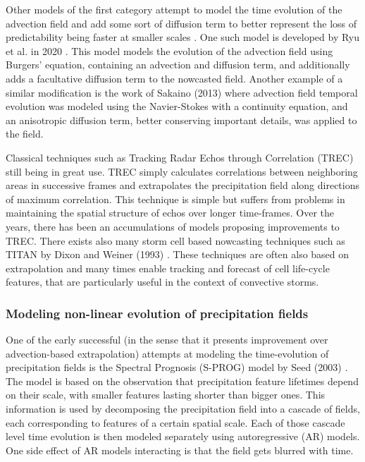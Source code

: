 Other models of the first category attempt to model the time evolution of the advection field and add some sort of diffusion term to better represent the loss of predictability being faster at smaller scales \cite{germann2002scale}. One such model is developed by Ryu et al. in 2020 \cite{ryu_improved_2020}. This model models the evolution of the advection field using Burgers' equation, containing an advection and diffusion term, and additionally adds a facultative diffusion term to the nowcasted field. Another example of a similar modification is the work of Sakaino (2013) \cite{sakaino_spatio-temporal_2013} where advection field temporal evolution was modeled using the Navier-Stokes with a continuity equation, and an anisotropic diffusion term, better conserving important details, was applied to the field. 

Classical techniques such as Tracking Radar Echos through Correlation (TREC) \cite{rinehart_three-dimensional_1978} still being in great use. TREC simply calculates correlations between neighboring areas in successive frames and extrapolates the precipitation field along directions of maximum correlation. This technique is simple but suffers from problems in maintaining the spatial structure of echos over longer time-frames. Over the years, there has been an accumulations of models proposing improvements to TREC. There exists also many storm cell based nowcasting techniques such as TITAN by Dixon and Weiner (1993) \cite{dixon1993titan}. These techniques are often also based on extrapolation and many times enable tracking and forecast of cell life-cycle features, that are particularly useful in the context of convective storms. 

\subsubsection*{Modeling non-linear evolution of precipitation fields}

One of the early successful (in the sense that it presents improvement over advection-based extrapolation) attempts at modeling the time-evolution of precipitation fields is the Spectral Prognosis (S-PROG) model by Seed (2003) \cite{seed_dynamic_2003}. The model is based on the observation that precipitation feature lifetimes depend on their scale, with smaller features lasting shorter than bigger ones. This information is used by decomposing the precipitation field into a cascade of fields, each corresponding to features of a certain spatial scale. Each of those cascade level time evolution is then modeled separately using autoregressive (AR) models. One side effect of AR models interacting is that the field gets blurred with time. 

